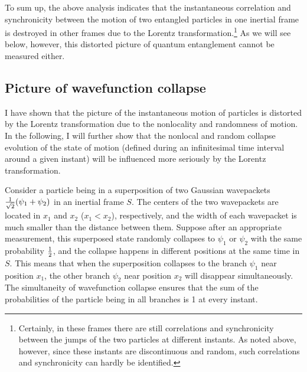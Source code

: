 To sum up, the above analysis indicates that the instantaneous correlation and synchronicity between the motion of two entangled particles in one inertial frame is destroyed in other frames due to the Lorentz transformation.\footnote{Certainly, in these frames there are still correlations and synchronicity between the jumps of the two particles at different instants. As noted above, however, since these instants are discontinuous and random, such correlations and synchronicity can hardly be identified.} As we will see below, however, this distorted picture of quantum entanglement cannot be measured either.

\subsection{Picture of wavefunction collapse}

I have shown that the picture of the instantaneous motion of particles is distorted by the Lorentz transformation due to the nonlocality and randomness of motion. In the following, I will further show that 
the nonlocal and random collapse evolution of the state of motion (defined during an infinitesimal time interval around a given instant) will be influenced more seriously by the Lorentz transformation.

Consider a particle being in a superposition of two Gaussian wavepackets ${1 \over \sqrt{2}}(\psi_1+\psi_2)$ in an inertial frame $S$. The centers of the two wavepackets are located in $x_1$ and $x_2$ ($x_1<x_2$), respectively, and the width of each wavepacket is much smaller than the distance between them. 
Suppose after an appropriate measurement, this superposed state randomly collapses to $\psi_1$ or $\psi_2$ with the same probability $1 \over 2$, and the collapse happens in different positions at the same time in $S$. This means that when the superposition collapses to the branch $\psi_1$ near position $x_1$, the other branch $\psi_2$ near position  $x_2$ will disappear simultaneously. The simultaneity of wavefunction collapse ensures that the sum of the probabilities of the particle being in all branches is 1 at every instant.

